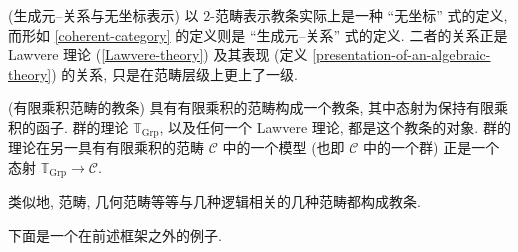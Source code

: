 \begin{remark}
	{(生成元--关系与无坐标表示)}
	以 $2$-范畴表示教条实际上是一种 ``无坐标'' 式的定义, 而形如 \ref{coherent-category} 的定义则是 ``生成元--关系'' 式的定义. 二者的关系正是 Lawvere 理论 (\ref{Lawvere-theory}) 及其表现 (定义 \ref{presentation-of-an-algebraic-theory}) 的关系, 只是在范畴层级上更上了一级.
\end{remark}

\begin{example}
	{(有限乘积范畴的教条)}
	具有有限乘积的范畴构成一个教条, 其中态射为保持有限乘积的函子. 群的理论 $\mathbb T_{\text{Grp}}$, 以及任何一个 Lawvere 理论, 都是这个教条的对象. 群的理论在另一具有有限乘积的范畴 $\mathcal C$ 中的一个模型 (也即 $\mathcal C$ 中的一个群) 正是一个态射 $\mathbb T_{\text{Grp}} \to \mathcal C$.
\end{example}

类似地, \regular{}范畴, 几何范畴等等与几种逻辑相关的几种范畴都构成教条. %

下面是一个在前述框架之外的例子.

